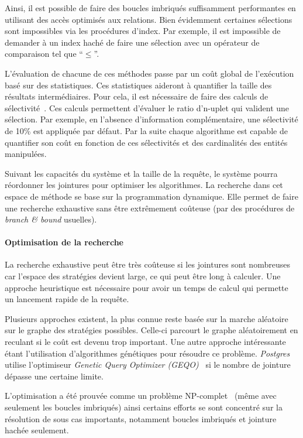 Ainsi, il est possible de faire des boucles imbriqués suffisamment performantes en utilisant des accès optimisés aux relations. Bien évidemment certaines sélections sont impossibles via les procédures d'index. Par exemple, il est impossible de demander à un index haché de faire une sélection avec un opérateur de comparaison tel que \enquote{$\leq$}.

L'évaluation de chacune de ces méthodes passe par un coût global de l'exécution basé sur des statistiques. Ces statistiques aideront à quantifier la taille des résultats intermédiaires. Pour cela, il est nécessaire de faire des calculs de sélectivité~\cite{Selinger:selectivity}. Ces calculs permettent d'évaluer le ratio d'n-uplet qui valident une sélection. Par exemple, en l'absence d'information complémentaire, une sélectivité de 10\% est appliquée par défaut. Par la suite chaque algorithme est capable de quantifier son coût en fonction de ces sélectivités et des cardinalités des entités manipulées.

Suivant les capacités du système et la taille de la requête, le système pourra réordonner les jointures pour optimiser les algorithmes. La recherche dans cet espace de méthode se base sur la programmation dynamique. Elle permet de faire une recherche exhaustive sans être extrêmement coûteuse (par des procédures de \textit{branch \& bound} usuelles).

\paragraph*{Optimisation de la recherche}
La recherche exhaustive peut être très coûteuse si les jointures sont nombreuses car l'espace des stratégies devient large, ce qui peut être long à calculer. Une approche heuristique est nécessaire pour avoir un temps de calcul qui permette un lancement rapide de la requête. 

Plusieurs approches existent, la plus connue reste basée sur la marche aléatoire sur le graphe des stratégies possibles. Celle-ci parcourt le graphe aléatoirement en reculant si le coût est devenu trop important. Une autre approche intéressante étant l'utilisation d'algorithmes génétiques pour résoudre ce problème. \textit{Postgres} utilise l'optimiseur \textit{Genetic Query Optimizer (GEQO)}~\cite{Postgres:geqo} si le nombre de jointure dépasse une certaine limite.

L'optimisation a été prouvée comme un problème NP-complet~\cite{Ibaraki:join} (même avec seulement les boucles imbriqués) ainsi certains efforts se sont concentré sur la résolution de sous cas importants, notamment boucles imbriqués et jointure hachée seulement.

